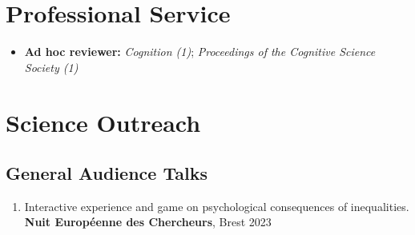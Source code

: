 \documentclass[letterpaper,11pt]{article}
\makeatletter
\newcommand{\resumeItem}[1]{
  \item\small{
    {#1 \vspace{-2pt}}
  }
}
\newcommand{\resumeItemWithYear}[3][ ]{ %
  \item\small{
    #2 \hfill {\small #3} \\
    #1
  }
}
\newcommand{\resumeSubheading}[4]{
  \vspace{1pt}\item
    \begin{tabular*}{0.97\textwidth}[t]{l@{\extracolsep{\fill}}r}
      \textbf{#1} & #2 \\
      \textit{\small#3} & \textit{\small #4} \\
    \end{tabular*}\vspace{-7pt}
}
\newcommand{\resumeSubHeadingListStart}{\begin{itemize}[leftmargin=0.15in, label={}]}
\newcommand{\resumeSubHeadingListEnd}{\end{itemize}}
\makeatother
\begin{document}
\section{Professional Service}
\begin{itemize}[leftmargin=0.15in, label={}]
    \resumeItem{\textbf{Ad hoc reviewer:} \emph{Cognition (1)}; \emph{Proceedings of the Cognitive Science Society (1)}} 
\end{itemize}


\section{Science Outreach}
\subsection*{General Audience Talks}
\begin{enumerate}
    \resumeItemWithYear{Interactive experience and game on psychological consequences of inequalities. \textbf{Nuit Européenne des Chercheurs}, Brest}{2023}
\end{enumerate}





\end{document}
